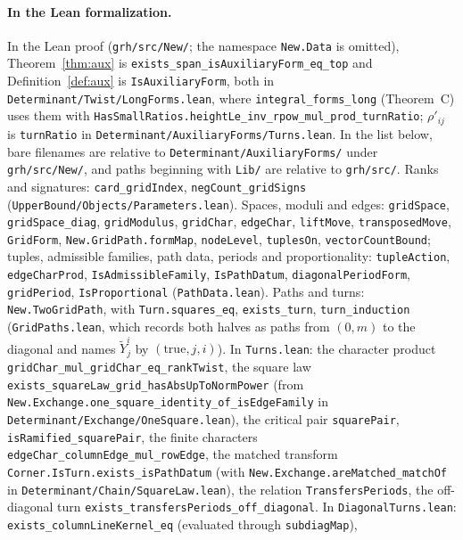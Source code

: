 \documentclass[reqno]{amsart}
\theoremstyle{definition}
\theoremstyle{plain}
\newcommand{\Yt}{\widetilde Y}
\newcommand{\tl}[1]{\texttt{#1}}
\begin{document}
\paragraph{In the Lean formalization.}
\begin{sloppypar}
In the Lean proof \cite{GL} (\tl{grh/\allowbreak src/\allowbreak New/}; the namespace \tl{New.\allowbreak Data} is omitted), Theorem~\ref{thm:aux} is \tl{exists\_\allowbreak span\_\allowbreak isAuxiliaryForm\_\allowbreak eq\_\allowbreak top} and Definition~\ref{def:aux} is \tl{IsAuxiliaryForm}, both in \tl{Determinant/\allowbreak Twist/\allowbreak LongForms.lean}, where \tl{integral\_\allowbreak forms\_\allowbreak long} (Theorem~C) uses them with \tl{HasSmallRatios.\allowbreak heightLe\_\allowbreak inv\_\allowbreak rpow\_\allowbreak mul\_\allowbreak prod\_\allowbreak turnRatio}; \(\rho'_{ij}\) is \tl{turnRatio} in \tl{Determinant/\allowbreak AuxiliaryForms/\allowbreak Turns.lean}.  In the list below, bare filenames are relative to \tl{Determinant/\allowbreak AuxiliaryForms/} under \tl{grh/\allowbreak src/\allowbreak New/}, and paths beginning with \tl{Lib/} are relative to \tl{grh/\allowbreak src/}.  Ranks and signatures: \tl{card\_\allowbreak gridIndex}, \tl{negCount\_\allowbreak gridSigns} (\tl{UpperBound/\allowbreak Objects/\allowbreak Parameters.lean}).  Spaces, moduli and edges: \tl{gridSpace}, \tl{gridSpace\_\allowbreak diag}, \tl{gridModulus}, \tl{gridChar}, \tl{edgeChar}, \tl{liftMove}, \tl{transposedMove}, \tl{GridForm}, \tl{New.\allowbreak GridPath.\allowbreak formMap}, \tl{nodeLevel}, \tl{tuplesOn}, \tl{vectorCountBound}; tuples, admissible families, path data, periods and proportionality: \tl{tupleAction}, \tl{edgeCharProd}, \tl{IsAdmissibleFamily}, \tl{IsPathDatum}, \tl{diagonalPeriodForm}, \tl{gridPeriod}, \tl{IsProportional} (\tl{PathData.lean}).  Paths and turns: \tl{New.\allowbreak TwoGridPath}, with \tl{Turn.\allowbreak squares\_\allowbreak eq}, \tl{exists\_\allowbreak turn}, \tl{turn\_\allowbreak induction} (\tl{GridPaths.lean}, which records both halves as paths from \((0,m)\) to the diagonal and names \(\Yt^i_j\) by \((\mathrm{true}, j, i)\)).  In \tl{Turns.lean}: the character product \tl{gridChar\_\allowbreak mul\_\allowbreak gridChar\_\allowbreak eq\_\allowbreak rankTwist}, the square law \tl{exists\_\allowbreak squareLaw\_\allowbreak grid\_\allowbreak hasAbsUpToNormPower} (from \tl{New.\allowbreak Exchange.\allowbreak one\_\allowbreak square\_\allowbreak identity\_\allowbreak of\_\allowbreak isEdgeFamily} in \tl{Determinant/\allowbreak Exchange/\allowbreak OneSquare.lean}), the critical pair \tl{squarePair}, \tl{isRamified\_\allowbreak squarePair}, the finite characters \tl{edgeChar\_\allowbreak columnEdge\_\allowbreak mul\_\allowbreak rowEdge}, the matched transform \tl{Corner.\allowbreak IsTurn.\allowbreak exists\_\allowbreak isPathDatum} (with \tl{New.\allowbreak Exchange.\allowbreak areMatched\_\allowbreak matchOf} in \tl{Determinant/\allowbreak Chain/\allowbreak SquareLaw.lean}), the relation \tl{TransfersPeriods}, the off-diagonal turn \tl{exists\_\allowbreak transfersPeriods\_\allowbreak off\_\allowbreak diagonal}.  In \tl{DiagonalTurns.lean}: \tl{exists\_\allowbreak columnLineKernel\_\allowbreak eq} (evaluated through \tl{subdiagMap}), 
\end{sloppypar}
\end{document}
